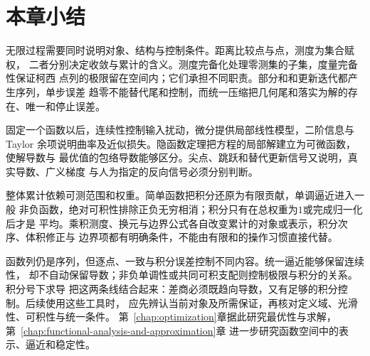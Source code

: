 \section{本章小结}
\label{sec:analysis-summary}

无限过程需要同时说明对象、结构与控制条件。距离比较点与点，测度为集合赋权，
二者分别决定收敛与累计的含义。测度完备化处理零测集的子集，度量完备性保证柯西
点列的极限留在空间内；它们承担不同职责。部分和和更新迭代都产生序列，单步误差
趋零不能替代尾和控制，而统一压缩把几何尾和落实为解的存在、唯一和停止误差。

固定一个函数以后，连续性控制输入扰动，微分提供局部线性模型，二阶信息与Taylor
余项说明曲率及近似损失。隐函数定理把方程的局部解建立为可微函数，使解导数与
最优值的包络导数能够区分。尖点、跳跃和替代更新信号又说明，真实导数、广义梯度
与人为指定的反向信号必须分别判断。

整体累计依赖可测范围和权重。简单函数把积分还原为有限贡献，单调逼近进入一般
非负函数，绝对可积性排除正负无穷相消；积分只有在总权重为$1$或完成归一化后才是
平均。乘积测度、换元与边界公式各自改变累计的对象或表示，积分次序、体积修正与
边界项都有明确条件，不能由有限和的操作习惯直接代替。

函数列仍是序列，但逐点、一致与积分误差控制不同内容。统一逼近能够保留连续性，
却不自动保留导数；非负单调性或共同可积支配则控制极限与积分的关系。积分号下求导
把这两条线结合起来：差商必须既趋向导数，又有足够的积分控制。后续使用这些工具时，
应先辨认当前对象及所需保证，再核对定义域、光滑性、可积性与统一条件。
第~\ref{chap:optimization}章据此研究最优性与求解，第~\ref{chap:functional-analysis-and-approximation}章
进一步研究函数空间中的表示、逼近和稳定性。
